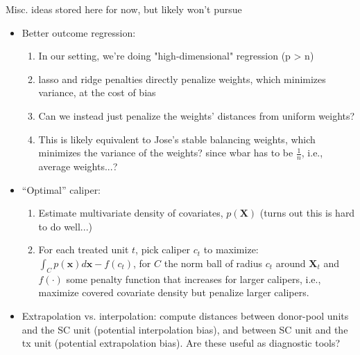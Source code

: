 \documentclass{article}
\newcommand{\bX}{\mathbf{X}}
\newcommand{\Xt}{\mathbf{X}_t}
\begin{document}
Misc. ideas stored here for now, but likely won't pursue
\begin{itemize}
    \item Better outcome regression:
    \begin{enumerate}
        \item In our setting, we're doing "high-dimensional" regression (p > n)
        \item lasso and ridge penalties directly penalize weights, which minimizes variance, at the cost of bias
        \item Can we instead just penalize the weights' distances from uniform weights?
        \item This is likely equivalent to Jose's stable balancing weights, which minimizes the variance of the weights? since wbar has to be $\frac{1}{n}$, i.e., average weights...?

    \end{enumerate}
    \item ``Optimal'' caliper:
    \begin{enumerate}
        \item Estimate multivariate density of covariates, $p(\bX)$ (turns out this is hard to do well...)
        \item For each treated unit $t$, pick caliper $c_t$ to maximize:
            $\int_{C} p(\mathbf{x})d\mathbf{x} - f(c_t)$, for $C$ the norm ball of radius $c_t$ around $\Xt$ and $f(\cdot)$ some penalty function that increases for larger calipers, i.e., maximize covered covariate density but penalize larger calipers.
    \end{enumerate}
    \item Extrapolation vs. interpolation: compute distances between donor-pool units and the SC unit (potential interpolation bias), and between SC unit and the tx unit (potential extrapolation bias). Are these useful as diagnostic tools?
\end{itemize}

\end{document}
